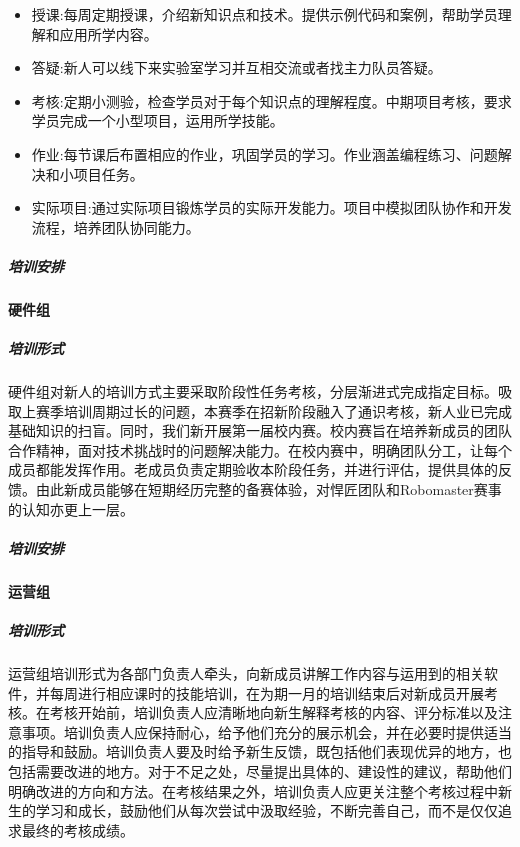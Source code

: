 
                \begin{itemize}
                    \item 授课:每周定期授课，介绍新知识点和技术。提供示例代码和案例，帮助学员理解和应用所学内容。
                    \item 答疑:新人可以线下来实验室学习并互相交流或者找主力队员答疑。
                    \item 考核:定期小测验，检查学员对于每个知识点的理解程度。中期项目考核，要求学员完成一个小型项目，运用所学技能。
                    \item 作业:每节课后布置相应的作业，巩固学员的学习。作业涵盖编程练习、问题解决和小项目任务。
                    \item 实际项目:通过实际项目锻炼学员的实际开发能力。项目中模拟团队协作和开发流程，培养团队协同能力。
                \end{itemize}

            \subparagraph{培训安排}


        \paragraph{硬件组}

            \subparagraph{培训形式}

                硬件组对新人的培训方式主要采取阶段性任务考核，分层渐进式完成指定目标。吸取上赛季培训周期过长的问题，本赛季在招新阶段融入了通识考核，新人业已完成基础知识的扫盲。同时，我们新开展第一届校内赛。校内赛旨在培养新成员的团队合作精神，面对技术挑战时的问题解决能力。在校内赛中，明确团队分工，让每个成员都能发挥作用。老成员负责定期验收本阶段任务，并进行评估，提供具体的反馈。由此新成员能够在短期经历完整的备赛体验，对悍匠团队和Robomaster赛事的认知亦更上一层。

            \subparagraph{培训安排}


        \paragraph{运营组}

            \subparagraph{培训形式}

                运营组培训形式为各部门负责人牵头，向新成员讲解工作内容与运用到的相关软件，并每周进行相应课时的技能培训，在为期一月的培训结束后对新成员开展考核。在考核开始前，培训负责人应清晰地向新生解释考核的内容、评分标准以及注意事项。培训负责人应保持耐心，给予他们充分的展示机会，并在必要时提供适当的指导和鼓励。培训负责人要及时给予新生反馈，既包括他们表现优异的地方，也包括需要改进的地方。对于不足之处，尽量提出具体的、建设性的建议，帮助他们明确改进的方向和方法。在考核结果之外，培训负责人应更关注整个考核过程中新生的学习和成长，鼓励他们从每次尝试中汲取经验，不断完善自己，而不是仅仅追求最终的考核成绩。

